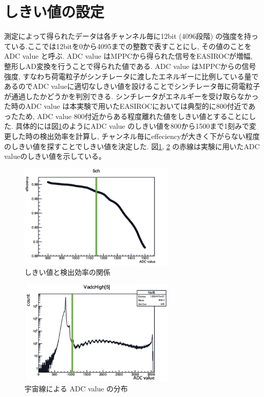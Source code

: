 \section{しきい値の設定}\label{sec:anal:threshold}
測定によって得られたデータは各チャンネル毎に12bit (4096段階) の強度を持っている.ここでは12bitを0から4095までの整数で表すことにし, その値のことを ADC value と呼ぶ.
ADC value はMPPCから得られた信号をEASIROCが増幅, 整形しAD変換を行うことで得られた値である.
ADC value はMPPCからの信号強度, すなわち荷電粒子がシンチレータに渡したエネルギーに比例している量であるのでADC valueに適切なしきい値を設けることでシンチレータ毎に荷電粒子が通過したかどうかを判別できる.
シンチレータがエネルギーを受け取らなかった時のADC value は本実験で用いたEASIROCにおいては典型的に800付近であったため, ADC value 800付近からある程度離れた値をしきい値とすることにした.
具体的には図\ref{fig:adc_eff}のようにADC value のしきい値を800から1500まで1刻みで変更した時の検出効率を計算し, チャンネル毎にeffeciencyが大きく下がらない程度のしきい値を探すことでしきい値を決定した.
図\ref{fig:adc_eff}, \ref{fig:threhist} の赤線は実験に用いたADC valueのしきい値を示している。
\begin{figure}[H]
    \centering
    \includegraphics[height=5.0cm]{img/adc_eff.png}
    \caption{しきい値と検出効率の関係}
    \label{fig:adc_eff}
\end{figure}
\begin{figure}[H]
    \centering
    \includegraphics[height=5.0cm]{img/pedestal.png}
    \caption{宇宙線による ADC value の分布}
    \label{fig:threhist}
\end{figure}

